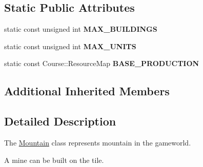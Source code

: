 \subsection*{Static Public Attributes}
\begin{DoxyCompactItemize}
\item 
\hypertarget{class_student_1_1_mountain_a7770f2a4ec6a2d86343df7076756e3e0}{static const unsigned int {\bfseries M\-A\-X\-\_\-\-B\-U\-I\-L\-D\-I\-N\-G\-S}}\label{class_student_1_1_mountain_a7770f2a4ec6a2d86343df7076756e3e0}

\item 
\hypertarget{class_student_1_1_mountain_a3a5336a816b1af127416508a82d54c24}{static const unsigned int {\bfseries M\-A\-X\-\_\-\-U\-N\-I\-T\-S}}\label{class_student_1_1_mountain_a3a5336a816b1af127416508a82d54c24}

\item 
\hypertarget{class_student_1_1_mountain_a2e86cfe77b1ece37f5bc48351394a334}{static const Course\-::\-Resource\-Map {\bfseries B\-A\-S\-E\-\_\-\-P\-R\-O\-D\-U\-C\-T\-I\-O\-N}}\label{class_student_1_1_mountain_a2e86cfe77b1ece37f5bc48351394a334}

\end{DoxyCompactItemize}
\subsection*{Additional Inherited Members}


\subsection{Detailed Description}
The \hyperlink{class_student_1_1_mountain}{Mountain} class represents mountain in the gameworld. 

A mine can be built on the tile. 

